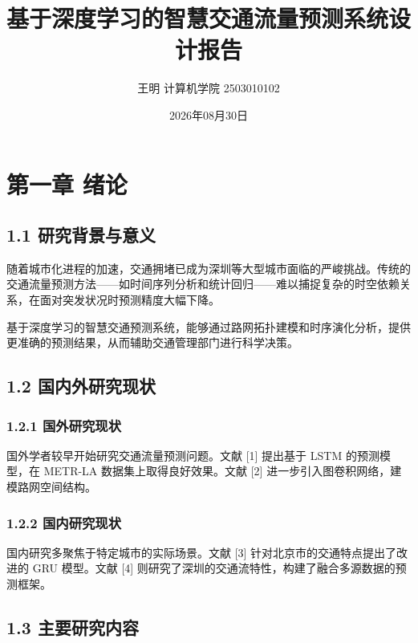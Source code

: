 \documentclass{harryopo-report}
\title{基于深度学习的智慧交通流量预测系统设计报告}
\author{王明 计算机学院 2503010102}
\institute{示例大学}
\date{2026年08月30日}
\begin{document}
\maketitle

\tableofcontents

\chapter*{第一章 绪论}

\section*{1.1 研究背景与意义}

随着城市化进程的加速，交通拥堵已成为深圳等大型城市面临的严峻挑战。传统的交通流量预测方法——如时间序列分析和统计回归——难以捕捉复杂的时空依赖关系，在面对突发状况时预测精度大幅下降。

基于深度学习的智慧交通预测系统，能够通过路网拓扑建模和时序演化分析，提供更准确的预测结果，从而辅助交通管理部门进行科学决策。

\section*{1.2 国内外研究现状}

\subsection*{1.2.1 国外研究现状}

国外学者较早开始研究交通流量预测问题。文献 [1] 提出基于 LSTM 的预测模型，在 METR-LA 数据集上取得良好效果。文献 [2] 进一步引入图卷积网络，建模路网空间结构。

\subsection*{1.2.2 国内研究现状}

国内研究多聚焦于特定城市的实际场景。文献 [3] 针对北京市的交通特点提出了改进的 GRU 模型。文献 [4] 则研究了深圳的交通流特性，构建了融合多源数据的预测框架。

\section*{1.3 主要研究内容}
\end{document}
